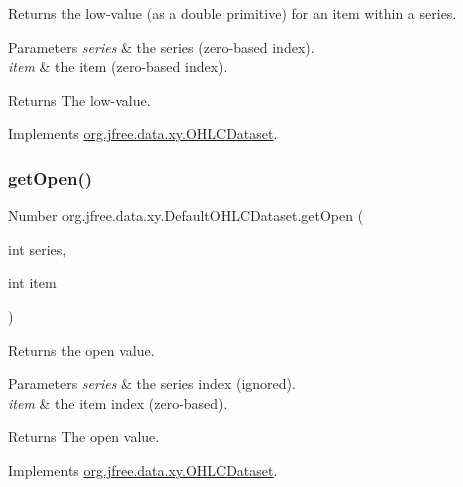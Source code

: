 Returns the low-\/value (as a double primitive) for an item within a series.


\begin{DoxyParams}{Parameters}
{\em series} & the series (zero-\/based index). \\
\hline
{\em item} & the item (zero-\/based index).\\
\hline
\end{DoxyParams}
\begin{DoxyReturn}{Returns}
The low-\/value. 
\end{DoxyReturn}


Implements \mbox{\hyperlink{interfaceorg_1_1jfree_1_1data_1_1xy_1_1_o_h_l_c_dataset_a19a2a153a113ed4f82eedd596e94d1ed}{org.\+jfree.\+data.\+xy.\+O\+H\+L\+C\+Dataset}}.

\mbox{\label{classorg_1_1jfree_1_1data_1_1xy_1_1_default_o_h_l_c_dataset_a851641b43354b55dcd343a57b5f1b4a9}} 
\subsubsection{\texorpdfstring{get\+Open()}{getOpen()}}
{\footnotesize\ttfamily Number org.\+jfree.\+data.\+xy.\+Default\+O\+H\+L\+C\+Dataset.\+get\+Open (\begin{DoxyParamCaption}\item[{int}]{series,  }\item[{int}]{item }\end{DoxyParamCaption})}

Returns the open value.


\begin{DoxyParams}{Parameters}
{\em series} & the series index (ignored). \\
\hline
{\em item} & the item index (zero-\/based).\\
\hline
\end{DoxyParams}
\begin{DoxyReturn}{Returns}
The open value. 
\end{DoxyReturn}


Implements \mbox{\hyperlink{interfaceorg_1_1jfree_1_1data_1_1xy_1_1_o_h_l_c_dataset_a652f2a7a04925cc72472d390217fef08}{org.\+jfree.\+data.\+xy.\+O\+H\+L\+C\+Dataset}}.

